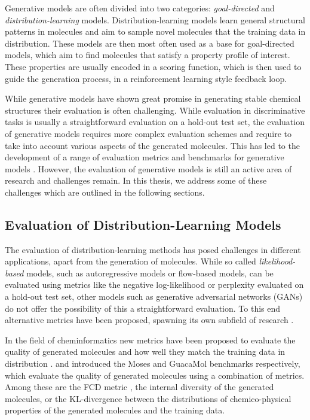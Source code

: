 Generative models are often divided into two categories: \emph{goal-directed}
and \emph{distribution-learning} models. Distribution-learning models learn
general structural patterns in molecules and aim to sample novel molecules that
the training data in distribution. These models are then most often used as a
base for goal-directed models, which aim to find molecules that satisfy a
property profile of interest. These properties are usually encoded in a
scoring function, which is then used to guide the generation process, in a
reinforcement learning style feedback loop.

While generative models have shown great promise in generating stable chemical
structures their evaluation is often challenging. While evaluation in
discriminative tasks is usually a straightforward evaluation on a hold-out test
set, the evaluation of generative models requires more complex evaluation
schemes and require to take into account various aspects of the generated
molecules. This has led to the development of a range of evaluation metrics
\citep{preuerFrechetChemNetDistance2018,gaoSynthesizabilityMoleculesProposed2020}
and benchmarks for generative models
\citep{polykovskiyMolecularSetsMOSES2020,brownGuacaMolBenchmarkingModels2019}.
However, the evaluation of generative models is still an active area of research
and challenges remain. In this thesis, we address some of these challenges which
are outlined in the following sections.

\subsection{Evaluation of Distribution-Learning Models}
The evaluation of distribution-learning methods has posed challenges in
different applications, apart from the generation of molecules. While so called
\emph{likelihood-based} models, such as autoregressive models or flow-based
models, can be evaluated using metrics like the negative log-likelihood or
perplexity evaluated on a hold-out test set, other models such as generative
adversarial networks (GANs) \citep{goodfellowGenerativeAdversarialNetworks2014}
do not offer the possibility of this a straightforward evaluation. To this end
alternative metrics have been proposed, spawning its own subfield of research
\citep{heuselGANsTrainedTwo2017}.

In the field of cheminformatics new metrics have been proposed to evaluate the
quality of generated molecules and how well they match the training data in
distribution \citep{preuerFrechetChemNetDistance2018}.
\citet{polykovskiyMolecularSetsMOSES2020} and
\citet{brownGuacaMolBenchmarkingModels2019} introduced the Moses and GuacaMol
benchmarks respectively, which evaluate the quality of generated molecules using
a combination of metrics. Among these are the FCD metric
\citep{preuerFrechetChemNetDistance2018}, the internal diversity
\citep{benhendaChemGANChallengeDrug2017} of the generated molecules, or the
KL-divergence between the distributions of chemico-physical properties of the
generated molecules and the training data.

